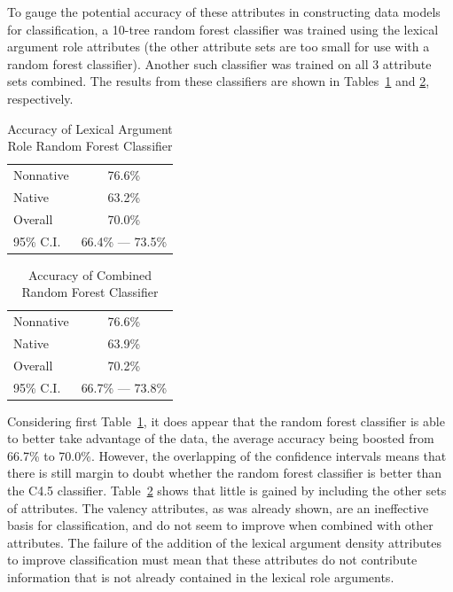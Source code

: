 \documentclass[main.tex]{subfiles}
\begin{document}
To gauge the potential accuracy of these attributes in constructing data models for classification, a 10-tree random forest classifier was trained using the lexical argument role attributes (the other attribute sets are too small for use with a random forest classifier). Another such classifier was trained on all 3 attribute sets combined. The results from these classifiers are shown in Tables~\ref{table:lex-role-rf-results} and \ref{table:combined-rf-results}, respectively.
\begin{table}[htbp]
\centering
\caption{Accuracy of Lexical Argument Role Random Forest Classifier}
\begin{tabular}{l c}
\toprule
Nonnative & 76.6\% \\
Native & 63.2\% \\
Overall & 70.0\% \\
95\% C.I. & 66.4\% --- 73.5\%\\
\bottomrule
\end{tabular}
\label{table:lex-role-rf-results}
\end{table}
\begin{table}[htbp]
\centering
\caption{Accuracy of Combined Random Forest Classifier}
\begin{tabular}{l c}
\toprule
Nonnative & 76.6\% \\
Native & 63.9\% \\
Overall & 70.2\% \\
95\% C.I. & 66.7\% --- 73.8\%\\
\bottomrule
\end{tabular}
\label{table:combined-rf-results}
\end{table}
Considering first Table~\ref{table:lex-role-rf-results}, it does appear that the random forest classifier is able to better take advantage of the data, the average accuracy being boosted from 66.7\% to 70.0\%. However, the overlapping of the confidence intervals means that there is still margin to doubt whether the random forest classifier is better than the C4.5 classifier. Table~\ref{table:combined-rf-results} shows that little is gained by including the other sets of attributes. The valency attributes, as was already shown, are an ineffective basis for classification, and do not seem to improve when combined with other attributes. The failure of the addition of the lexical argument density attributes to improve classification must mean that these attributes do not contribute information that is not already contained in the lexical role arguments.
\newpage
\biblio
\end{document}
